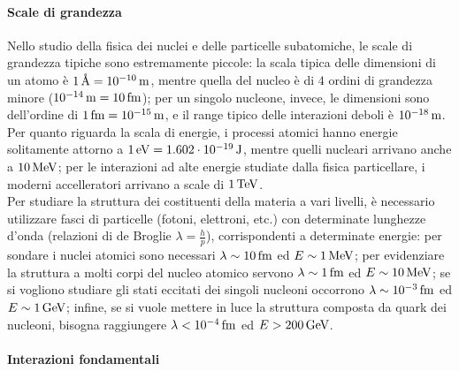 
\paragraph{Scale di grandezza}

Nello studio della fisica dei nuclei e delle particelle subatomiche, le scale di grandezza tipiche sono estremamente piccole: la scala tipica delle dimensioni di un atomo è $ 1\,\text{\AA} = 10^{-10}\,\text{m}  $, mentre quella del nucleo è di $ 4 $ ordini di grandezza minore ($ 10^{-14}\,\text{m} = 10\,\text{fm} $); per un singolo nucleone, invece, le dimensioni sono dell'ordine di $ 1\,\text{fm} = 10^{-15}\,\text{m} $, e il range tipico delle interazioni deboli è $ 10^{-18}\,\text{m} $.\\
Per quanto riguarda la scala di energie, i processi atomici hanno energie solitamente attorno a $ 1\,\text{eV} = 1.602\cdot10^{-19}\,\text{J} $, mentre quelli nucleari arrivano anche a $ 10\,\text{MeV} $; per le interazioni ad alte energie studiate dalla fisica particellare, i moderni accelleratori arrivano a scale di $ 1\,\text{TeV} $.\\
Per studiare la struttura dei costituenti della materia a vari livelli, è necessario utilizzare fasci di particelle (fotoni, elettroni, etc.) con determinate lunghezze d'onda (relazioni di de Broglie $ \lambda = \frac{h}{p} $), corrispondenti a determinate energie: per sondare i nuclei atomici sono necessari $ \lambda \sim 10\,\text{fm} $ ed $ E \sim 1\,\text{MeV} $; per evidenziare la struttura a molti corpi del nucleo atomico servono $ \lambda \sim 1\,\text{fm} $ ed $ E \sim 10\,\text{MeV} $; se si vogliono studiare gli stati eccitati dei singoli nucleoni occorrono $ \lambda \sim 10^{-3}\,\text{fm} $ ed $ E \sim 1\,\text{GeV} $; infine, se si vuole mettere in luce la struttura composta da quark dei nucleoni, bisogna raggiungere $ \lambda < 10^{-4}\,\text{fm} $ ed $ E > 200\,\text{GeV} $.

\paragraph{Interazioni fondamentali}


